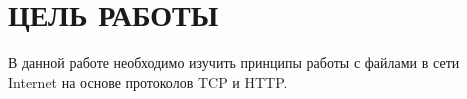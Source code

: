 \section{ЦЕЛЬ РАБОТЫ}

В данной работе необходимо изучить принципы работы с файлами в сети Internet на основе протоколов TCP и HTTP.

\newpage
